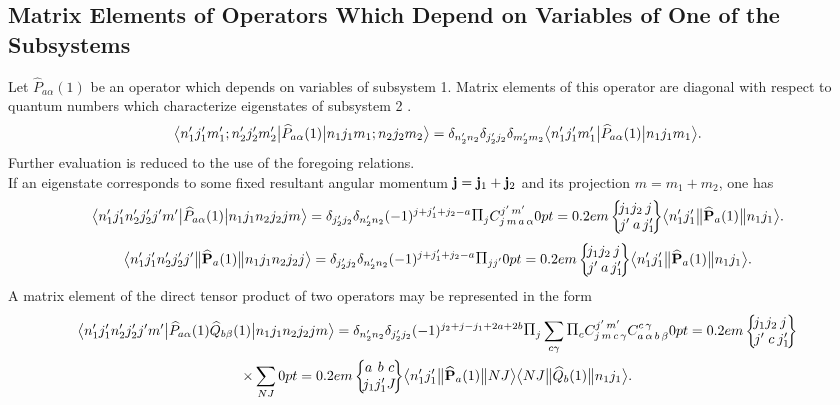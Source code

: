 \subsection{Matrix Elements of Operators Which Depend on  Variables of One of the Subsystems}\label{sec:13.1.5}
Let \(\widehat{P}_{a \alpha}(1)\) be an operator which depends on variables of subsystem 1. Matrix elements of this operator are diagonal with respect to quantum numbers which characterize eigenstates of subsystem 2 .
\begin{equation}
\bigl\langle  n_{1}^{\prime} j_{1}^{\prime} m_{1}^{\prime} ; n_{2}^{\prime} j_{2}^{\prime} m_{2}^{\prime} \big|  \widehat{P}_{a \alpha}(1) \big| n_{1} j_{1} m_{1} ; n_{2} j_{2} m_{2} \bigr\rangle=\delta_{n_{2}^{\prime} n_{2}} \delta_{j_{2}^{\prime} j_{2}} \delta_{m_{2}^{\prime} m_{2}}
\bigl\langle  n_{1}^{\prime} j_{1}^{\prime} m_{1}^{\prime} \big|  \widehat{P}_{a \alpha}(1) \big| n_{1} j_{1} m_{1} \bigr\rangle. \label{eq:13:1:39}
\end{equation}
Further evaluation is reduced to the use of the foregoing relations.\\
If an eigenstate corresponds to some fixed resultant angular momentum \(\mathbf{j}=\mathbf{j}_{1}+\mathbf{j}_{2}\) and its projection \(m=m_{1}+m_{2}\), one has
\begin{equation}
\braOket{ n_{1}^{\prime} j_{1}^{\prime} n_{2}^{\prime} j_{2}^{\prime} j^{\prime} m^{\prime}}{ \widehat{P}_{a \alpha}(1)}{n_{1} j_{1} n_{2} j_{2} j m}=\delta_{j_{2}^{\prime} j_{2}} \delta_{n_{2}^{\prime} n_{2}}(-1)^{j+j_{1}^{\prime}+j_{2}-a} \Fact{j} 
\clebsch{j}{m}{a}{\alpha}{j^{\prime}}{m^{\prime}}
\sixj{j_{1}}{j_{2}}{j}{j^{\prime}}{a}{j_{1}^{\prime}}
\braOketred{ n_{1}^{\prime} j_{1}^{\prime}}{\widehat{\vect{P}}_{a}(1)}{ n_{1} j_{1}}.
\label{eq:13:1:40}
\end{equation}
\begin{equation*}
\braOketred{ n_{1}^{\prime} j_{1}^{\prime} n_{2}^{\prime} j_{2}^{\prime} j^{\prime}}{ \widehat{\vect{P}}_{a}(1)}{n_{1} j_{1} n_{2} j_{2} j}=\delta_{j_{2}^{\prime} j_{2}} \delta_{n_{2}^{\prime} n_{2}}(-1)^{j+j_{1}^{\prime}+j_{2}-a} \Fact{j j^{\prime}}
\sixj{j_{1}}{j_{2}}{j}{j^{\prime}}{a}{j_{1}^{\prime}}
\braOketred{ n_{1}^{\prime} j_{1}^{\prime}}{\widehat{\vect{P}}_{a}(1)}{ n_{1} j_{1}}.
\end{equation*}
A matrix element of the direct tensor product of two operators may be represented in the form
\begin{multline}
\braOket{ n_{1}^{\prime} j_{1}^{\prime} n_{2}^{\prime} j_{2}^{\prime} j^{\prime} m^{\prime}}{ \widehat{P}_{a \alpha}(1) \widehat{Q}_{b \beta}(1)}{n_{1} j_{1} n_{2} j_{2} j m}=\delta_{n_{2}^{\prime} n_{2}} \delta_{j_{2}^{\prime} j_{2}}(-1)^{j_{2}+j-j_{1}+2 a+2 b} \Fact{j} \sum_{c \gamma} \Fact{c} 
\clebsch{j}{m}{c}{\gamma}{j^{\prime}}{m^{\prime}} 
\clebsch{a}{\alpha}{b}{\beta}{c}{\gamma}
\sixj{j_{1}}{j_{2}}{j}{j^{\prime}}{c}{j_{1}^{\prime}} \\
\times \sum_{N J}
\sixj{a}{b}{c}{j_{1}}{j_{1}^{\prime}}{J}
\braOketred{ n_{1}^{\prime} j_{1}^{\prime}}{\widehat{\vect{P}}_{a}(1)}{ N J}
\braOketred{ N J}{\widehat{Q}_{b}(1)}{ n_{1} j_{1}}. \label{eq:13:1:41}
\end{multline}
